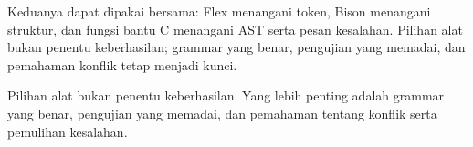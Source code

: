 Keduanya dapat dipakai bersama: Flex menangani token, Bison menangani
struktur, dan fungsi bantu C menangani AST serta pesan kesalahan.
Pilihan alat bukan penentu keberhasilan; grammar yang benar,
pengujian yang memadai, dan pemahaman konflik tetap menjadi kunci.

\begin{infobox}
Pilihan alat bukan penentu keberhasilan. Yang lebih penting adalah
grammar yang benar, pengujian yang memadai, dan pemahaman tentang
konflik serta pemulihan kesalahan.
\end{infobox}
